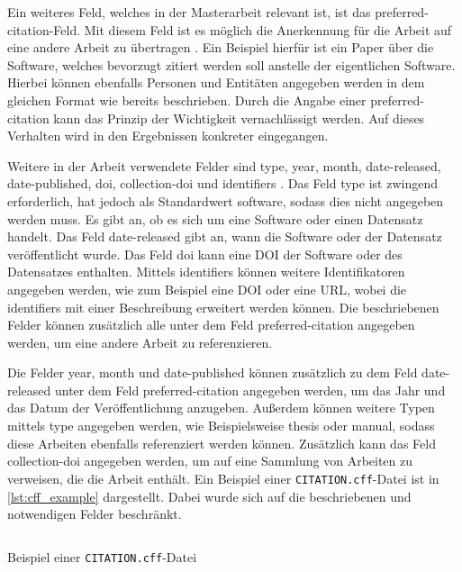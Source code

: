Ein weiteres Feld, welches in der Masterarbeit relevant ist, ist das \glqq preferred-citation\grqq{}-Feld.
Mit diesem Feld ist es möglich die Anerkennung für die Arbeit auf eine andere Arbeit zu übertragen \autocite{druskat_citation_2021}.
Ein Beispiel hierfür ist ein Paper über die Software, welches bevorzugt zitiert werden soll anstelle der eigentlichen Software.
Hierbei können ebenfalls Personen und Entitäten angegeben werden in dem gleichen Format wie bereits beschrieben.
Durch die Angabe einer \glqq preferred-citation\grqq{} kann das Prinzip der Wichtigkeit vernachlässigt werden.
Auf dieses Verhalten wird in den Ergebnissen konkreter eingegangen.

Weitere in der Arbeit verwendete Felder sind \glqq type\grqq{}, \glqq year\grqq{}, \glqq month\grqq{}, \glqq date-released\grqq{}, \glqq date-published\grqq{}, \glqq doi\grqq{}, \glqq collection-doi\grqq{} und \glqq identifiers\grqq{} \autocite{druskat_citation_2021}.
Das Feld \glqq type\grqq{} ist zwingend erforderlich, hat jedoch als Standardwert \glqq software\grqq{}, sodass dies nicht angegeben werden muss.
Es gibt an, ob es sich um eine Software oder einen Datensatz handelt.
Das Feld \glqq date-released\grqq{} gibt an, wann die Software oder der Datensatz veröffentlicht wurde.
Das Feld \glqq doi\grqq{} kann eine DOI der Software oder des Datensatzes enthalten.
Mittels \glqq identifiers\grqq{} können weitere Identifikatoren angegeben werden, wie zum Beispiel eine DOI oder eine URL, wobei die \glqq identifiers\grqq{} mit einer Beschreibung erweitert werden können.
Die beschriebenen Felder können zusätzlich alle unter dem Feld \glqq preferred-citation\grqq{} angegeben werden, um eine andere Arbeit zu referenzieren.

Die Felder \glqq year\grqq{}, \glqq month\grqq{} und \glqq date-published\grqq{} können zusätzlich zu dem Feld \glqq date-released\grqq{} unter dem Feld \glqq preferred-citation\grqq{} angegeben werden, um das Jahr und das Datum der Veröffentlichung anzugeben.
Außerdem können weitere Typen mittels \glqq type\grqq{} angegeben werden, wie Beispielsweise \glqq thesis\grqq{} oder \glqq manual\grqq{}, sodass diese Arbeiten ebenfalls referenziert werden können.
Zusätzlich kann das Feld \glqq collection-doi\grqq{} angegeben werden, um auf eine Sammlung von Arbeiten zu verweisen, die die Arbeit enthält.
Ein Beispiel einer \texttt{CITATION.cff}-Datei ist in \autoref{lst:cff_example} dargestellt.
Dabei wurde sich auf die beschriebenen und notwendigen Felder beschränkt.

\begin{listing}
    \inputminted{yaml}{../CITATION.cff}
    \caption{Beispiel einer \texttt{CITATION.cff}-Datei}
    \label{lst:cff_example}
\end{listing}

